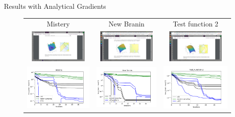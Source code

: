 \documentclass{beamer}
\begin{document}
\begin{frame}{Results with Analytical Gradients}

\begin{figure}
	
	\centering
	\begin{tabular}{ccc}
		Mistery&
		New Branin&
		Test function 2\\
		
		\includegraphics[height=1.6cm, trim={450 300 450 300},clip]{Mistery.png}&
		\includegraphics[height=1.6cm, trim={450 240 450 360},clip]{New_Branin.png}&
		\includegraphics[height=1.6cm, trim={450 230 450 370},clip]{test_function_2.png}\\
		\includegraphics[width=0.32\linewidth]{mistery_OC_gradients.pdf}&
		\includegraphics[width=0.32\linewidth]{New_Branin_OC_gradients.pdf}&
		\includegraphics[width=0.32\linewidth]{test_function_2_OC_gradients.pdf}\\
	\end{tabular}	
\end{figure}	

\end{frame}
\end{document}
